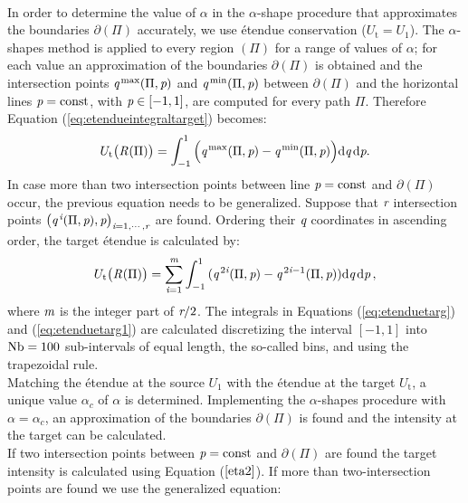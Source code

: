 \\ \indent In order to determine the value of $\alpha$ in the $\alpha$-shape procedure that approximates the boundaries $\partial$$(\Pi)$ accurately, we use \'{e}tendue conservation ($U_{\textrm{t}}= U_1$). The $\alpha$-shapes method is applied to every region $(\Pi)$ for a range of values of $\alpha$;
   for each value an approximation of the boundaries $\partial$$(\Pi)$ is obtained and
   the intersection points $\textit{q}^{\textrm{\,max}}(\Pi,\textit{p})$ and $\textit{q}^{\textrm{\,min}}(\Pi,\textit{p})$ between $\partial$$(\Pi)$
and the horizontal lines $\textit{p}=\textrm{const}$, with $\textit{p}\in[-1,1]$, are computed for every path $\Pi$.
Therefore Equation (\ref{eq:etendueintegraltarget}) becomes:
\begin{equation}\label{eq:etenduetarg}
 U_\textrm{t}\big(\mbox{$\emph{R}_{\textit{}}$}(\Pi)\big)= \int_{-1}^{1}{\Big(\textit{q}^{\textrm{\,max}}(\Pi,\textit{p})-\textit{q}^{\textrm{\,min}}(\Pi,\textit{p})\Big)} \textrm{d}\textit{q}\,\textrm{d}\textit{p}.
\end{equation} In case more than two intersection points between line $\textit{p}=\textrm{const}$ and $\partial$$(\Pi)$ occur, the previous equation needs to be generalized. Suppose that $\textit{r}$ intersection points $\big(\textit{q}^{\,\textit{i}}(\Pi,\textit{p}), \textit{p}\big)_{\textit{i} = 1, \cdots, \textit{r}}$ are found. 
Ordering their $\textit{q}$ coordinates in ascending order, the target \'{e}tendue is calculated by:
\begin{equation}\label{eq:etenduetarg1}
 U_\textrm{t}\big(\mbox{$\emph{R}_{\textit{}}$}(\Pi)\big) = \sum_{\textit{i} = 1}^{\textit{m}}\int_{-1}^{1}
{(\textit{q}^{\,2\textit{i}}(\Pi,\textit{p})}-{\textit{q}^{\,2\textit{i}-1} (\Pi, \textit{p}) )} \textrm{d}\textit{q}\,\textrm{d}\textit{p}\,,
\end{equation}
where $\textit{m}$ is the integer part of $\textit{r}/2$. 
The integrals in Equations (\ref{eq:etenduetarg}) and (\ref{eq:etenduetarg1}) are calculated discretizing the interval $[-1, 1]$
   into $\textrm{Nb}=100$ sub-intervals of equal length, the so-called bins, and using the trapezoidal rule.
\\ \indent Matching the \'{e}tendue at the source $U_1$ with the \'{e}tendue at the target $U_{\textrm{t}}$, a unique value $\alpha_{c}$ of $\alpha$  is determined. Implementing the $\alpha$-shapes procedure with $\alpha = \alpha_c$, an approximation of the boundaries $\partial$$(\Pi)$ is found and the intensity at the target can be calculated.\\ \indent If two intersection points between $\textit{p}=\textrm{const}$ and $\partial$$(\Pi)$ are found the target intensity is calculated using Equation ($\ref{eta2}$). If more than two-intersection points are found we use the generalized equation:
